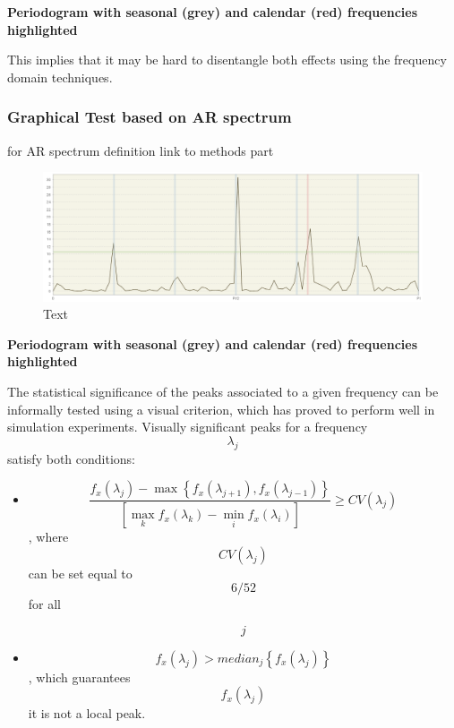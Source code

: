 \documentclass[
  letterpaper,
  DIV=11,
  numbers=noendperiod]{scrreprt}
\begin{document}
\textbf{Periodogram with seasonal (grey) and calendar (red) frequencies
highlighted}

This implies that it may be hard to disentangle both effects using the
frequency domain techniques.

\hypertarget{graphical-test-based-on-ar-spectrum}{%
\subsubsection{Graphical Test based on AR
spectrum}\label{graphical-test-based-on-ar-spectrum}}

for AR spectrum definition link to methods part

\begin{figure}

{\centering \includegraphics{./All_images/UG_A_image19.png}

}

\caption{Text}

\end{figure}

\textbf{Periodogram with seasonal (grey) and calendar (red) frequencies
highlighted}

The statistical significance of the peaks associated to a given
frequency can be informally tested using a visual criterion, which has
proved to perform well in simulation experiments. Visually significant
peaks for a frequency \[\lambda_{j}\] satisfy both conditions:

\begin{itemize}
\item
  \[ \frac{f_{x}(\lambda_{j})- \max \left\{f_{x}(\lambda_{j+1}),f_{x}(\lambda_{j-1}) \right\}}{\left[ \max_{k}f_{x}(\lambda_{k})-\min_{i}f_{x}(\lambda_{i}) \right]}\ge CV(\lambda_{j}) \],
  where \[ CV(\lambda_{j})\] can be set equal to \[6/52 \] for all

  \[j\]
\item
  \[ f_{x}(\lambda_{j})> median_{j} \left\{ f_{x}(\lambda_{j}) \right\}\],
  which guarantees \[ f_{x}(\lambda_{j}) \] it is not a local peak.
\end{itemize}
\end{document}
